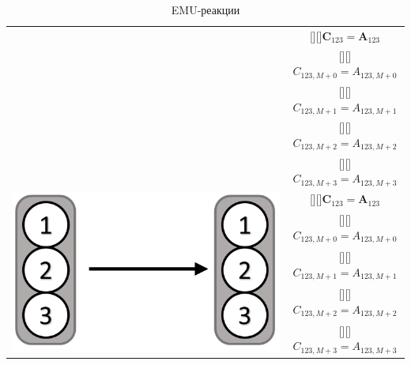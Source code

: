 \documentclass[14pt, a4paper]{extreport}
\newcommand{\adj}[1]{\raisebox{-2pt}[\height][\depth]{#1}}
\begin{document}
\begin{table}
\begin{center}
\begin{tabular}{c | c}
{\begin{minipage}{0.3\linewidth}
			 	\end{minipage}
			 } 
		     & \adj{$\mathbf{C}_{123} = \mathbf{A}_{123}$}\\[.5ex]
			 & \adj{$C_{123,M+0} = A_{123,M+0}$}\\ [.5ex]
			 & \adj{$C_{123,M+1} = A_{123,M+1}$}\\ [.5ex]
			 & \adj{$C_{123,M+2} = A_{123,M+2}$} \\ [.5ex]
			 & \adj{$C_{123,M+3} = A_{123,M+3}$} \\ [.5ex]
			 \hline 
			 \multirow{5}{*}[-1mm]{
			 	\begin{minipage}{0.3\linewidth}
			 		\centering{Унимолекулярная реакция}
			 		\includegraphics[scale=0.85]{EMU_reaction_3.png}
			 	\end{minipage}
			 } 
		     & \adj{$\mathbf{C}_{123} = \mathbf{A}_{123}$}\\[.5ex]
				& \adj{$C_{123,M+0} = A_{123,M+0}$}\\ [.5ex]
				& \adj{$C_{123,M+1} = A_{123,M+1}$}\\ [.5ex]
				& \adj{$C_{123,M+2} = A_{123,M+2}$} \\ [.5ex]
				& \adj{$C_{123,M+3} = A_{123,M+3}$} \\ [.5ex]
			 \hline 
		\end{tabular}
		\caption{EMU-реакции}
		\label{EMU_reactions}
	\end{center}
\end{table} %
\end{document}
